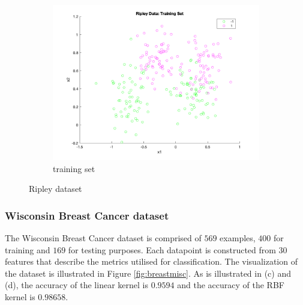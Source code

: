 \documentclass[a4paper, 11pt, one column]{article}
\begin{document}
\begin{figure}[hbt]
\begin{subfigure}{0.45\linewidth}
            \includegraphics[width=\linewidth]{images/ripley_training.png}
            \caption{training set}
        \end{subfigure}
        \caption{Ripley dataset}        
        \label{fig:ripleymisc}
\end{figure}

\subsubsection{Wisconsin Breast Cancer dataset}
The Wisconsin Breast Cancer dataset is comprised of $569$ examples, $400$ for training and $169$ for testing purposes. Each datapoint is constructed from $30$ features that describe the metrics utilised for classification. The visualization of the dataset is illustrated in Figure \ref{fig:breastmisc}. As is illustrated in (c) and (d), the accuracy of the linear kernel is $0.9594$ and the accuracy of the RBF kernel is $0.98658$.
\end{document}
